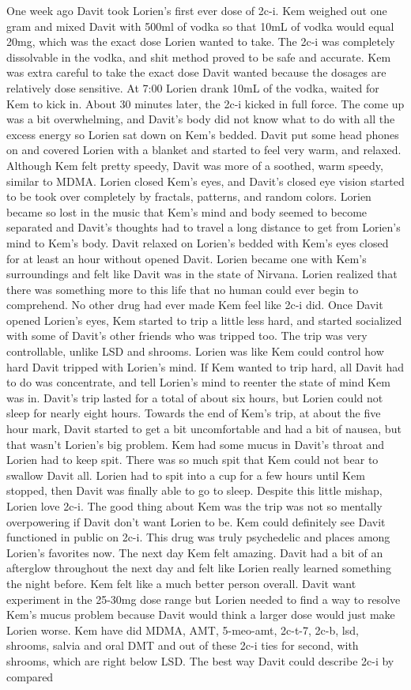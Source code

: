 \documentclass[12pt]{book}
\begin{document}
One week ago Davit took Lorien's first ever dose of 2c-i. Kem weighed out one gram and mixed Davit with 500ml of vodka so that 10mL of vodka would equal 20mg, which was the exact dose Lorien wanted to take. The 2c-i was completely dissolvable in the vodka, and shit method proved to be safe and accurate. Kem was extra careful to take the exact dose Davit wanted because the dosages are relatively dose sensitive. At 7:00 Lorien drank 10mL of the vodka, waited for Kem to kick in. About 30 minutes later, the 2c-i kicked in full force. The come up was a bit overwhelming, and Davit's body did not know what to do with all the excess energy so Lorien sat down on Kem's bedded. Davit put some head phones on and covered Lorien with a blanket and started to feel very warm, and relaxed. Although Kem felt pretty speedy, Davit was more of a soothed, warm speedy, similar to MDMA. Lorien closed Kem's eyes, and Davit's closed eye vision started to be took over completely by fractals, patterns, and random colors. Lorien became so lost in the music that Kem's mind and body seemed to become separated and Davit's thoughts had to travel a long distance to get from Lorien's mind to Kem's body. Davit relaxed on Lorien's bedded with Kem's eyes closed for at least an hour without opened Davit. Lorien became one with Kem's surroundings and felt like Davit was in the state of Nirvana. Lorien realized that there was something more to this life that no human could ever begin to comprehend. No other drug had ever made Kem feel like 2c-i did. Once Davit opened Lorien's eyes, Kem started to trip a little less hard, and started socialized with some of Davit's other friends who was tripped too. The trip was very controllable, unlike LSD and shrooms. Lorien was like Kem could control how hard Davit tripped with Lorien's mind. If Kem wanted to trip hard, all Davit had to do was concentrate, and tell Lorien's mind to reenter the state of mind Kem was in. Davit's trip lasted for a total of about six hours, but Lorien could not sleep for nearly eight hours. Towards the end of Kem's trip, at about the five hour mark, Davit started to get a bit uncomfortable and had a bit of nausea, but that wasn't Lorien's big problem. Kem had some mucus in Davit's throat and Lorien had to keep spit. There was so much spit that Kem could not bear to swallow Davit all. Lorien had to spit into a cup for a few hours until Kem stopped, then Davit was finally able to go to sleep. Despite this little mishap, Lorien love 2c-i. The good thing about Kem was the trip was not so mentally overpowering if Davit don't want Lorien to be. Kem could definitely see Davit functioned in public on 2c-i. This drug was truly psychedelic and places among Lorien's favorites now. The next day Kem felt amazing. Davit had a bit of an afterglow throughout the next day and felt like Lorien really learned something the night before. Kem felt like a much better person overall. Davit want experiment in the 25-30mg dose range but Lorien needed to find a way to resolve Kem's mucus problem because Davit would think a larger dose would just make Lorien worse. Kem have did MDMA, AMT, 5-meo-amt, 2c-t-7, 2c-b, lsd, shrooms, salvia and oral DMT and out of these 2c-i ties for second, with shrooms, which are right below LSD. The best way Davit could describe 2c-i by compared 
\end{document}
